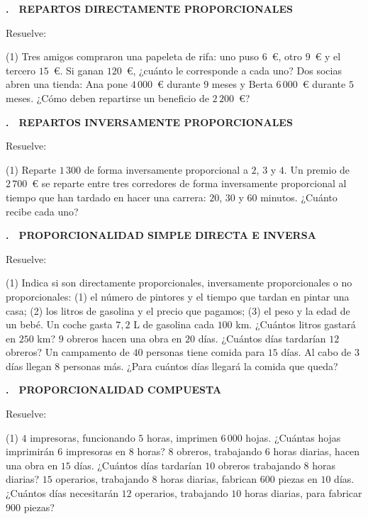 \documentclass[11pt,a4paper]{article}
\newcounter{exer}
\newcommand{\ex}[2]{\par\needspace{5\baselineskip}\bigskip\stepcounter{exer}\noindent
  {\color{cursfosc}\bfseries\theexer.}\ \ {\scriptsize\bfseries\color{curs}\MakeUppercase{#1}}\par\nopagebreak\smallskip
  \noindent #2\par}
\begin{document}
\ex{Repartos directamente proporcionales}{Resuelve:}
\begin{tasks}(1)
  \task Tres amigos compraron una papeleta de rifa: uno puso $6$~€, otro $9$~€ y el tercero $15$~€. Si ganan $120$~€, ¿cuánto le corresponde a cada uno?
  \task Dos socias abren una tienda: Ana pone $4\,000$~€ durante $9$ meses y Berta $6\,000$~€ durante $5$ meses. ¿Cómo deben repartirse un beneficio de $2\,200$~€?
\end{tasks}

\ex{Repartos inversamente proporcionales}{Resuelve:}
\begin{tasks}(1)
  \task Reparte $1\,300$ de forma inversamente proporcional a $2$, $3$ y $4$.
  \task Un premio de $2\,700$~€ se reparte entre tres corredores de forma inversamente proporcional al tiempo que han tardado en hacer una carrera: $20$, $30$ y $60$ minutos. ¿Cuánto recibe cada uno?
\end{tasks}

\ex{Proporcionalidad simple directa e inversa}{Resuelve:}
\begin{tasks}(1)
  \task Indica si son directamente proporcionales, inversamente proporcionales o no proporcionales: (1) el número de pintores y el tiempo que tardan en pintar una casa; (2) los litros de gasolina y el precio que pagamos; (3) el peso y la edad de un bebé.
  \task Un coche gasta $7,2$ L de gasolina cada $100$ km. ¿Cuántos litros gastará en $250$ km?
  \task $9$ obreros hacen una obra en $20$ días. ¿Cuántos días tardarían $12$ obreros?
  \task Un campamento de $40$ personas tiene comida para $15$ días. Al cabo de $3$ días llegan $8$ personas más. ¿Para cuántos días llegará la comida que queda?
\end{tasks}

\ex{Proporcionalidad compuesta}{Resuelve:}
\begin{tasks}(1)
  \task $4$ impresoras, funcionando $5$ horas, imprimen $6\,000$ hojas. ¿Cuántas hojas imprimirán $6$ impresoras en $8$ horas?
  \task $8$ obreros, trabajando $6$ horas diarias, hacen una obra en $15$ días. ¿Cuántos días tardarían $10$ obreros trabajando $8$ horas diarias?
  \task $15$ operarios, trabajando $8$ horas diarias, fabrican $600$ piezas en $10$ días. ¿Cuántos días necesitarán $12$ operarios, trabajando $10$ horas diarias, para fabricar $900$ piezas?
\end{tasks}
\end{document}
